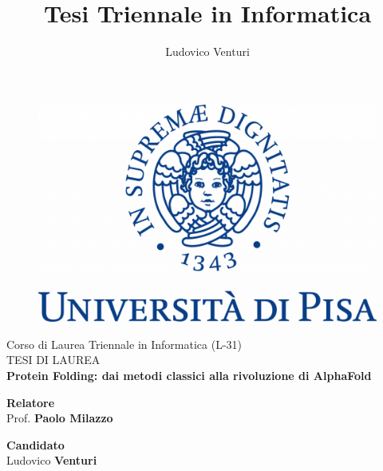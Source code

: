 \documentclass[12pt]{report}
\begin{document}
	
\author{Ludovico Venturi}
\title{Tesi Triennale in Informatica}
	
\begin{titlepage}
	\begin{figure}
		\centering\includegraphics[scale=0.2] {images/UNIPI_Logo.png}
	\end{figure}
	
	\begin{center}
		{\LARGE{ Corso di Laurea Triennale in Informatica (L-31) \\}}
		\vspace{2cm}
		{\Large { TESI DI LAUREA }}\\
		\vspace{2cm}
		{\LARGE { \textbf{Protein Folding: dai metodi classici alla rivoluzione di AlphaFold} }}
	\end{center}
	
	\vspace{2cm}
	
	\begin{minipage}[t]{0.6\textwidth}
		{\large{\textbf{Relatore}\\ Prof. \textbf{Paolo Milazzo}}}
		\vspace{0.5cm}
	\end{minipage}\hfill\begin{minipage}[t]{0.3\textwidth}\raggedleft
		{\large{\textbf{Candidato} \\ Ludovico \textbf{Venturi}\\ }}
	\end{minipage}
	
	\vspace{25mm}
	
\end{titlepage}
\end{document}
